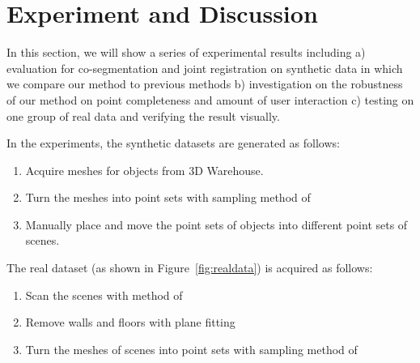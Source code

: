 \section{Experiment and Discussion}
In this section, we will show a series of experimental results including 
a) evaluation for co-segmentation and joint registration on synthetic data in which we compare our method to previous methods  b) investigation on the robustness of our method on point completeness and amount of user interaction c) testing on one group of real data and verifying the result visually.

In the experiments, the synthetic datasets are generated as follows:
\begin{enumerate}
	\item Acquire meshes for objects from 3D Warehouse.
	\item Turn the meshes into point sets with sampling method of \cite{PossionSampling}
	\item Manually place and move the point sets of objects into different point sets of scenes.   
\end{enumerate}
The real dataset (as shown in Figure~\ref{fig:realdata}) is acquired as follows:
\begin{enumerate}
	\item Scan the scenes with method of \cite{KinectFusion} 
	\item Remove walls and floors with plane fitting
	\item Turn the meshes of scenes into point sets with sampling method of \cite{PossionSampling}
\end{enumerate}

